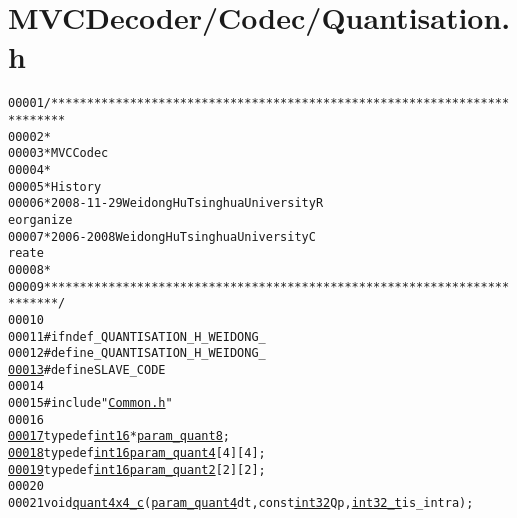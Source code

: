\hypertarget{_quantisation_8h_source}{
\section{MVCDecoder/Codec/Quantisation.h}
}


\begin{footnotesize}\begin{alltt}
00001 \textcolor{comment}{/************************************************************************}
00002 \textcolor{comment}{ *}
00003 \textcolor{comment}{ * MVC Codec}
00004 \textcolor{comment}{ * }
00005 \textcolor{comment}{ * History}
00006 \textcolor{comment}{ * 2008-11-29           Weidong Hu              Tsinghua University             R
      eorganize}
00007 \textcolor{comment}{ * 2006-2008            Weidong Hu              Tsinghua University             C
      reate}
00008 \textcolor{comment}{ * }
00009 \textcolor{comment}{ ************************************************************************/}
00010 
00011 \textcolor{preprocessor}{#ifndef \_QUANTISATION\_H\_WEIDONG\_}
00012 \textcolor{preprocessor}{}\textcolor{preprocessor}{#define \_QUANTISATION\_H\_WEIDONG\_}
\hypertarget{_quantisation_8h_source_l00013}{}\hyperlink{_quantisation_8h_a995f6a4907273b8d56b6543ab1a57d17}{00013} \textcolor{preprocessor}{}\textcolor{preprocessor}{#define SLAVE\_CODE}
00014 \textcolor{preprocessor}{}
00015 \textcolor{preprocessor}{#include "\hyperlink{_common_8h}{Common.h}"}
00016 
\hypertarget{_quantisation_8h_source_l00017}{}\hyperlink{_quantisation_8h_a8bf84fa166851783a628e4a4e5a48888}{00017} \textcolor{keyword}{typedef} \hyperlink{_types_8h_a259fa4834387bd68627ddf37bb3ebdb9}{int16}* \hyperlink{_quantisation_8h_a8bf84fa166851783a628e4a4e5a48888}{param_quant8};
\hypertarget{_quantisation_8h_source_l00018}{}\hyperlink{_quantisation_8h_aaf238cae50a8b754d811c856535578b4}{00018} \textcolor{keyword}{typedef} \hyperlink{_types_8h_a259fa4834387bd68627ddf37bb3ebdb9}{int16} \hyperlink{_quantisation_8h_aaf238cae50a8b754d811c856535578b4}{param_quant4}[4][4];
\hypertarget{_quantisation_8h_source_l00019}{}\hyperlink{_quantisation_8h_aa2419725a4ad76a3137ed57a1789cf8e}{00019} \textcolor{keyword}{typedef} \hyperlink{_types_8h_a259fa4834387bd68627ddf37bb3ebdb9}{int16} \hyperlink{_quantisation_8h_aa2419725a4ad76a3137ed57a1789cf8e}{param_quant2}[2][2];
00020 
00021 \textcolor{keywordtype}{void} \hyperlink{_quantisation_8cpp_af304d1aed221004504fa9475387cf32e}{quant4x4_c}(\hyperlink{_quantisation_8h_aaf238cae50a8b754d811c856535578b4}{param_quant4} dt, \textcolor{keyword}{const} \hyperlink{_types_8h_a43d43196463bde49cb067f5c20ab8481}{int32} Qp, \hyperlink{_types_8h_a115ba3a1b24a8702355c5dbd61ce01e0}{int32_t} is\_intra);

\end{alltt}
\end{footnotesize}
